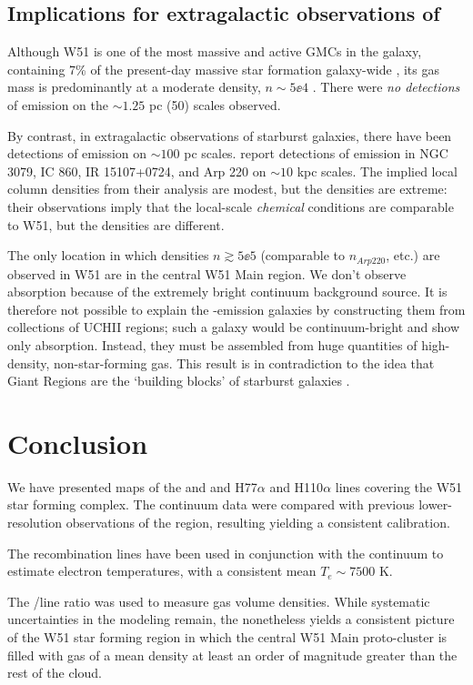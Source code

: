 \subsection{Implications for extragalactic observations of \formaldehyde}
Although W51 is one of the most massive and active GMCs in the galaxy,
containing 7\% of the present-day massive star formation galaxy-wide
\citep{Urquhart2014a}, its gas mass is predominantly at a moderate density,
$n\sim5\ee{4}$ \percc.  There were \emph{no detections} of \formaldehyde
emission on the $\sim1.25$ pc (50\arcsec) scales observed.

By contrast, in extragalactic observations of starburst galaxies, there have
been detections of emission on $\sim100$ pc scales.  \citet{Mangum2013a} report
detections of \formaldehyde \oneone emission in NGC 3079, IC 860, IR
15107+0724, and Arp 220 on $\sim10$ kpc scales.  The implied local column
densities from their analysis are modest, but the densities are extreme: their
observations imply that the local-scale \emph{chemical} conditions are
comparable to W51, but the densities are different.

The only location in which densities $n\gtrsim5\ee{5}$ (comparable to $n_{Arp
220}$, etc.) are observed in W51 are in the central W51 Main region.  We don't
observe absorption because of the extremely bright continuum background source.
It is therefore not possible to explain the \formaldehyde-emission galaxies by
constructing them from collections of UCHII regions; such a galaxy would be
continuum-bright and show only \formaldehyde absorption.  Instead, they must be
assembled from huge quantities of high-density, non-star-forming gas.
This result is in contradiction to the idea that Giant \hii Regions are the
`building blocks' of starburst galaxies \citep[e.g.][]{Miura2014a}.  


\section{Conclusion}
We have presented maps of the \formaldehyde \oneone and \twotwo and H77$\alpha$
and H110$\alpha$ lines covering the W51 star forming complex.  The continuum
data were compared with previous lower-resolution observations of the region,
resulting yielding a consistent calibration.

The recombination lines have been used in conjunction with the continuum to
estimate electron temperatures, with a consistent mean $T_e\sim7500$ K.

The \formaldehyde \oneone/\twotwo line ratio was used to measure gas volume
densities.  While systematic uncertainties in the modeling remain, the
\formaldehyde nonetheless yields a consistent picture of the W51 star forming
region in which the central W51 Main proto-cluster is filled with gas of a mean
density at least an order of magnitude greater than the rest of the cloud.

